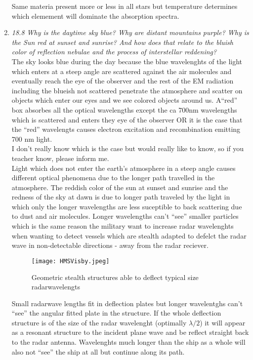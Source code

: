 \documentclass[./exercises.tex]{subfiles}
\begin{document}
\begin{enumerate}
Same materia present more or less in all stars but temperature determines which elemement will
dominate the absorption spectra.\\

\item\textit{18.8 Why is the daytime sky blue? 
Why are distant mountains purple?
Why is the Sun red at sunset and sunrise?
And how does that relate to the bluish color of reflection nebulae and 
the process of interstellar reddening?}\\


The sky looks blue during the day because the blue wavelenghts of the light which enters at a steep angle are scattered against the air molecules
and eventually reach the eye of the observer and the rest of the EM radiation including
the blueish not scattered penetrate the atmosphere and scatter on objects which enter our
eyes and we see colored objects around us.
A``red'' box absorbes all the optical wavelengths except the ca 700nm wavelengths which is scattered and enters they eye
of the observer
OR it is the case that the ``red'' wavelengts causes electron excitation and recombination emitting
700 nm light.\\
I don't really know which is the case but would really like to know,
so if you teacher know, please inform me.\\

Light which does not enter the earth's atmosphere in a steep angle causes different
optical phenomena due to the longer path travelled in the atmosphere.
The reddish color of the sun at sunset and sunrise and the redness of the sky at dawn
is due to longer path traveled by the light in which only the longer wavelengths are less 
suceptible to back scattering due to dust and air molecules.
Longer wavelengths can't ``see'' smaller particles which is
the same reason the military want to increase radar wavelenghts when wanting to detect vessels which are stealth adapted
to defelct the radar wave in non-detectable directions - away from the radar reciever.\\

\begin{figure}[H]
  \centering
  \texttt{[image: HMSVisby.jpeg]}
  \caption{Geometric stealth structures able to deflect typical size radarwavelengts}
  \label{fig:fig2}
\end{figure}

Small radarwave lengths fit in deflection plates but longer wavelentghs can't ``see''
the angular fitted plate in the structure.
If the whole deflection structure is of the size of the radar wavelenght (optimally $\lambda/2$)
it will appear as a resonant structure to the incident plane wave and be reflect straight back to the radar antenna.
Wavelenghts much longer than the ship as a whole will also not ``see'' the ship at all but continue
along its path.


\end{enumerate}
\end{document}
